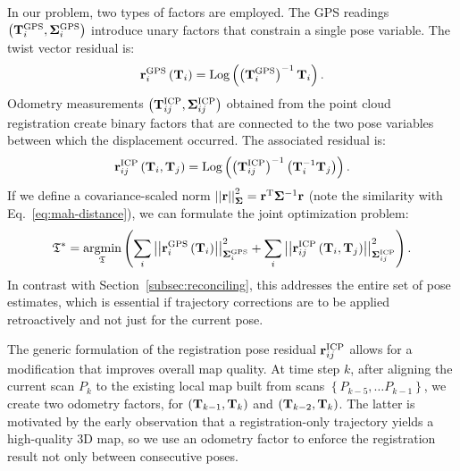 \newcommand{\tigps}{\pose_i^{\text{GPS}}}
\newcommand{\tijicp}{\pose_{ij}^{\text{ICP}}}
\newcommand{\covigps}{\matx{\Sigma}_i^{\text{GPS}}}
\newcommand{\covijicp}{\matx{\Sigma}_{ij}^{\text{ICP}}}
In our problem, two types of factors are employed. The GPS readings $\left(\tigps, \covigps\right)$ introduce unary factors that constrain a single pose variable. The twist vector residual is:
\begin{equation}
	\vecx{r}_i^{\text{GPS}}\left(\pose_i\right) =
	\Logmap{\left(\tigps\right)^{-1}\pose_i}
	\eqdot
\end{equation}
Odometry measurements $\left(\tijicp, \covijicp\right)$ obtained from the point cloud registration create binary factors that are connected to the two pose variables between which the displacement occurred. The associated residual is:
\begin{equation}
	\vecx{r}_{ij}^{\text{ICP}}\left(\pose_i, \pose_j\right) =
	\Logmap{\left(\tijicp \right)^{-1} \left(\pose_i^{-1} \pose_j\right)}
	\eqdot
\end{equation}
If we define a covariance-scaled norm $
	\left|\left|{\mathbf{r}}\right|\right|_{\mathbf{\Sigma}}^2 =
	{\mathbf{r}}^\text{T}\mathbf{\Sigma}^{-1}\mathbf{r}
$ (note the similarity with Eq.~\ref{eq:mah-distance}), we can formulate the joint optimization problem:
\begin{equation}
	\mathfrak{T}^{*} = \underset{\mathfrak{T}}{\text{argmin}}
	\left(
	\sum_{i} \normm{\vecx{r}_i^{\text{GPS}}\left(\pose_i\right)}_{\covigps}^2
	+
	\sum_{i} \normm{\vecx{r}_{ij}^{\text{ICP}}\left(\pose_i, \pose_j\right)}_{\covijicp}^2
	\right)
	\eqdot
\end{equation}
In contrast with Section~\ref{subsec:reconciling}, this addresses the entire set of pose estimates, which is essential if trajectory corrections are to be applied retroactively and not just for the current pose.

The generic formulation of the registration pose residual $\mathbf{r}_{ij}^{\text{ICP}}$ allows for a modification that improves overall map quality. At time step $k$, after aligning the current scan $P_k$ to the existing local map built from scans $\left\{P_{k-5}, \dots P_{k-1}\right\}$, we create two odometry factors, for $\left(\mathbf{T}_{k-1},\mathbf{T}_k\right)$ and $\left(\mathbf{T}_{k-2},\mathbf{T}_k\right)$. The latter is motivated by the early observation that a registration-only trajectory yields a high-quality 3D map, so we use an odometry factor to enforce the registration result not only between consecutive poses.



